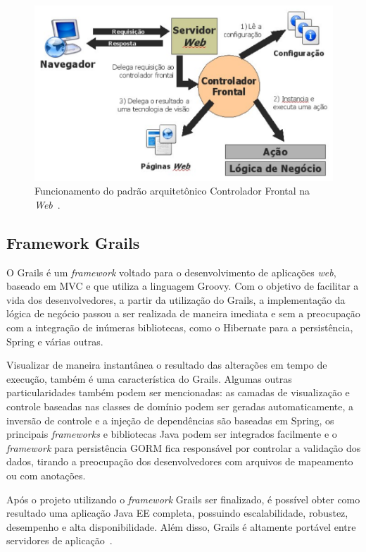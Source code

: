 \begin{figure}[h]
	\centering
	\includegraphics[scale=.35]{figuras/fig-ref-controlador-frontal} 
	\caption{Funcionamento do padrão arquitetônico Controlador Frontal na \textit{Web}~\cite{souza:masterthesis07}.}
	\label{fig-ref-controlador-frontal}
\end{figure}

\subsection{Framework Grails}
\label{sec-ref-framework-grails}

O Grails é um \textit{framework} voltado para o desenvolvimento de aplicações \textit{web}, baseado em MVC e que utiliza a linguagem Groovy. Com o objetivo de facilitar a vida dos desenvolvedores, a partir da utilização do Grails, a implementação da lógica de negócio passou a ser realizada de maneira imediata e sem a preocupação com a integração de inúmeras bibliotecas, como o Hibernate para a persistência, Spring e várias outras.

Visualizar de maneira instantânea o resultado das alterações em tempo de execução, também é uma característica do Grails. Algumas outras particularidades também podem ser mencionadas: as camadas de visualização e controle baseadas nas classes de domínio podem ser geradas automaticamente, a inversão de controle e a injeção de dependências são baseadas em Spring, os principais \textit{frameworks} e bibliotecas Java podem ser integrados facilmente e o \textit{framework} para persistência GORM fica responsável por controlar a validação dos dados, tirando a preocupação dos desenvolvedores com arquivos de mapeamento ou com anotações.

Após o projeto utilizando o \textit{framework} Grails ser finalizado, é possível obter como resultado uma aplicação Java EE completa, possuindo escalabilidade, robustez, desempenho e alta disponibilidade. Além disso, Grails é altamente portável entre servidores de aplicação~\cite{weissmann:fgapdw15}.       


